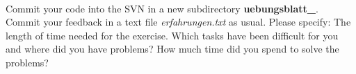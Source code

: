 \\
Commit your code into the SVN in a new subdirectory 
\textbf{uebungsblatt\_\ExerciseSheetNumber}. Commit your feedback in a text file \emph{erfahrungen.txt} as usual. Please specify: The length of time needed for the exercise. Which tasks have been difficult for you and where did you have problems? How much time did you spend to solve the problems?
